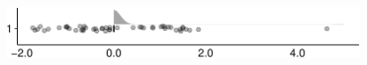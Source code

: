 \documentclass[
]{article}
\begin{document}
\begin{minipage}[t]{0.3\linewidth}

~

\end{minipage}%
\begin{minipage}[t]{0.7\linewidth}

\includegraphics[width=396px]{codebook_template_files/figure-latex/q7_40_rainplot-1}

\end{minipage}
 \vspace*{-5mm} 

\begin{minipage}[t]{0.3\linewidth}

~

\end{minipage}%
\begin{minipage}[t]{0.7\linewidth}

~

\end{minipage}
 \vspace*{-7mm} 
\end{document}
